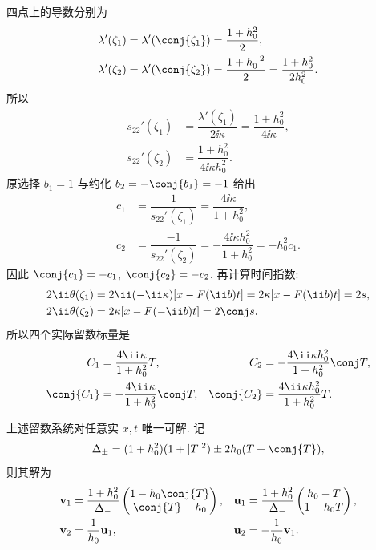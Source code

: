 四点上的导数分别为
\[
\begin{aligned}
\lambda'(\zeta_1)=\lambda'(\conj{\zeta_1})
&=\dfrac{1+h_0^2}{2},\\
\lambda'(\zeta_2)=\lambda'(\conj{\zeta_2})
&=\dfrac{1+h_0^{-2}}{2}
=\dfrac{1+h_0^2}{2h_0^2}.
\end{aligned}
\]
所以
\[
\begin{aligned}
s_{22}'(\zeta_1)
&=\dfrac{\lambda'(\zeta_1)}{2\ii\kappa}
=\dfrac{1+h_0^2}{4\ii\kappa},\\
s_{22}'(\zeta_2)
&=\dfrac{1+h_0^2}{4\ii\kappa h_0^2}.
\end{aligned}
\]
原选择 $b_1=1$ 与约化 $b_2=-\conj{b_1}=-1$ 给出
\[
\begin{aligned}
c_1&=\dfrac{1}{s_{22}'(\zeta_1)}
=\dfrac{4\ii\kappa}{1+h_0^2},\\
c_2&=\dfrac{-1}{s_{22}'(\zeta_2)}
=-\dfrac{4\ii\kappa h_0^2}{1+h_0^2}
=-h_0^2c_1.
\end{aligned}
\]
因此 $\conj{c_1}=-c_1$, $\conj{c_2}=-c_2$.
再计算时间指数:
\[
\begin{aligned}
2\ii\theta(\zeta_1)
&=2\ii(-\ii\kappa)[x-F(\ii b)t]
=2\kappa[x-F(\ii b)t]=2s,\\
2\ii\theta(\zeta_2)
&=2\kappa[x-F(-\ii b)t]=2\conj s.
\end{aligned}
\]
所以四个实际留数标量是
\[
\begin{aligned}
C_1&=\dfrac{4\ii\kappa}{1+h_0^2}T,&
C_2&=-\dfrac{4\ii\kappa h_0^2}{1+h_0^2}\conj T,\\
\conj{C_1}&=-\dfrac{4\ii\kappa}{1+h_0^2}\conj T,&
\conj{C_2}&=\dfrac{4\ii\kappa h_0^2}{1+h_0^2}T.
\end{aligned}
\]
\begin{lemma}[一轨道系统的消元]\label{lem:direct-solve}
上述留数系统对任意实 $x,t$ 唯一可解. 记
\begin{equation}\label{eq:delta-pair}
\Delta_\pm=(1+h_0^2)(1+|T|^2)\pm2h_0(T+\conj{T}),
\end{equation}
则其解为
\begin{align}
\mathbf v_1&=\dfrac{1+h_0^2}{\Delta_-}
\begin{pmatrix}1-h_0\conj{T}\\\conj{T}-h_0\end{pmatrix},&
\mathbf u_1&=\dfrac{1+h_0^2}{\Delta_-}
\begin{pmatrix}h_0-T\\1-h_0T\end{pmatrix},\label{eq:direct-vu1}\\
\mathbf v_2&=\dfrac{1}{h_0}\mathbf u_1,&
\mathbf u_2&=-\dfrac{1}{h_0}\mathbf v_1.\label{eq:direct-vu2}
\end{align}
\end{lemma}
